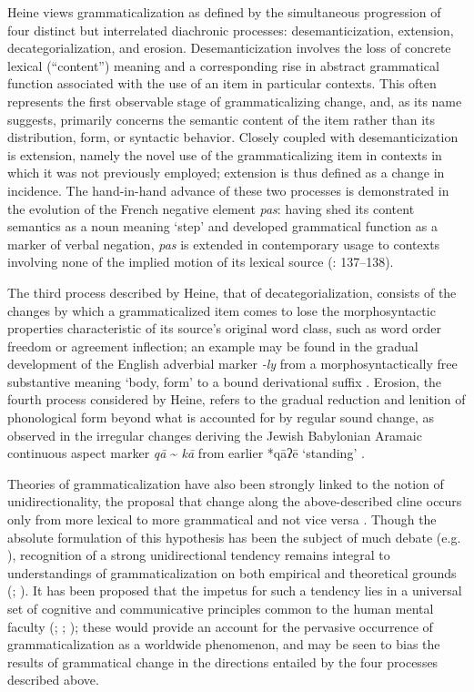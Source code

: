 \documentclass[output=paper]{langsci/langscibook}
\begin{document}
Heine views grammaticalization as defined by the simultaneous progression of four distinct but interrelated diachronic processes: desemanticization, extension, decategorialization, and erosion. Desemanticization involves the loss of concrete lexical (“content”) meaning and a corresponding rise in abstract grammatical function associated with the use of an item in particular contexts. This often represents the first observable stage of grammaticalizing change, and, as its name suggests, primarily concerns the semantic content of the item rather than its distribution, form, or syntactic behavior. Closely coupled with desemanticization is extension, namely the novel use of the grammaticalizing item in contexts in which it was not previously employed; extension is thus defined as a change in incidence.  The hand-in-hand advance of these two processes is demonstrated in the evolution of the French negative element \textit{pas}: having shed its content semantics as a noun meaning ‘step’ and developed grammatical function as a marker of verbal negation, \textit{pas} is extended in contemporary usage to contexts involving none of the implied motion of its lexical source (\citealt{Hansen2009}: 137–138). 

The third process described by Heine, that of decategorialization, consists of the changes by which a grammaticalized item comes to lose the morphosyntactic properties characteristic of its source’s original word class, such as word order freedom or agreement inflection; an example may be found in the gradual development of the English adverbial marker \textit{{}-ly} from a morphosyntactically free substantive meaning ‘body, form’ to a bound derivational suffix \citep[505]{Ramat2011}. Erosion, the fourth process considered by Heine, refers to the gradual reduction and lenition of phonological form beyond what is accounted for by regular sound change, as observed in the irregular changes deriving the Jewish Babylonian Aramaic continuous aspect marker \textit{qā} {\textasciitilde} \textit{kā} from earlier *qāʔē ‘standing’ \citep[134]{Rubin2005}.

Theories of grammaticalization have also been strongly linked to the notion of unidirectionality, the proposal that change along the above-described cline occurs only from more lexical to more grammatical and not vice versa \citep{Lehmann2015}.  Though the absolute formulation of this hypothesis has been the subject of much debate (e.g. \citealt{Norde2009}), recognition of a strong unidirectional tendency remains integral to understandings of grammaticalization on both empirical and theoretical grounds (\citealt{Haspelmath1998}; \citealt{Heine2007}). It has been proposed that the impetus for such a tendency lies in a universal set of cognitive and communicative principles common to the human mental faculty (\citealt{Claudi1986}; \citealt{Bybee2003}; \citealt{Lehmann2015}); these would provide an account for the pervasive occurrence of grammaticalization as a worldwide  phenomenon, and may be seen to bias the results of grammatical change in the directions entailed by the four processes described above.
\end{document}
